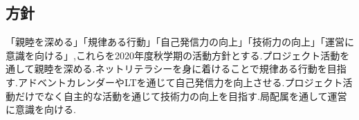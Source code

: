 \subsection*{\firstGrade{}方針}



「親睦を深める」「規律ある行動」「自己発信力の向上」「技術力の向上」「運営に意識を向ける」,これらを{\firstGrade{}}2020年度秋学期の活動方針とする.プロジェクト活動を通して親睦を深める.ネットリテラシーを身に着けることで規律ある行動を目指す.アドベントカレンダーやLTを通じて自己発信力を向上させる.プロジェクト活動だけでなく自主的な活動を通じて技術力の向上を目指す.局配属を通して運営に意識を向ける.
